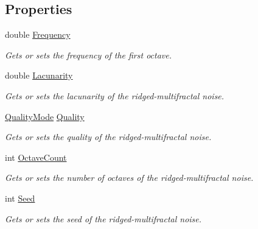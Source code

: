 \subsection*{Properties}
\begin{DoxyCompactItemize}
\item 
double \hyperlink{class_lib_noise_1_1_generator_1_1_ridged_multifractal_a053e32ef9919d0f1acf581b14a4e4a4f}{Frequency}
\begin{DoxyCompactList}\small\item\em Gets or sets the frequency of the first octave. \end{DoxyCompactList}\item 
double \hyperlink{class_lib_noise_1_1_generator_1_1_ridged_multifractal_ad77f707fad346ec3103c15110fd79089}{Lacunarity}
\begin{DoxyCompactList}\small\item\em Gets or sets the lacunarity of the ridged-\/multifractal noise. \end{DoxyCompactList}\item 
\hyperlink{namespace_lib_noise_ab253d2180e71b8b4b51e250163ca0e27}{Quality\+Mode} \hyperlink{class_lib_noise_1_1_generator_1_1_ridged_multifractal_aa09e67f1126b8dfbb6872ecb4dac0249}{Quality}
\begin{DoxyCompactList}\small\item\em Gets or sets the quality of the ridged-\/multifractal noise. \end{DoxyCompactList}\item 
int \hyperlink{class_lib_noise_1_1_generator_1_1_ridged_multifractal_a5e00830831a8847f6492bc521294e682}{Octave\+Count}
\begin{DoxyCompactList}\small\item\em Gets or sets the number of octaves of the ridged-\/multifractal noise. \end{DoxyCompactList}\item 
int \hyperlink{class_lib_noise_1_1_generator_1_1_ridged_multifractal_ad32f33d7fb1da8310c5ab148bb78f20e}{Seed}
\begin{DoxyCompactList}\small\item\em Gets or sets the seed of the ridged-\/multifractal noise. \end{DoxyCompactList}\end{DoxyCompactItemize}
